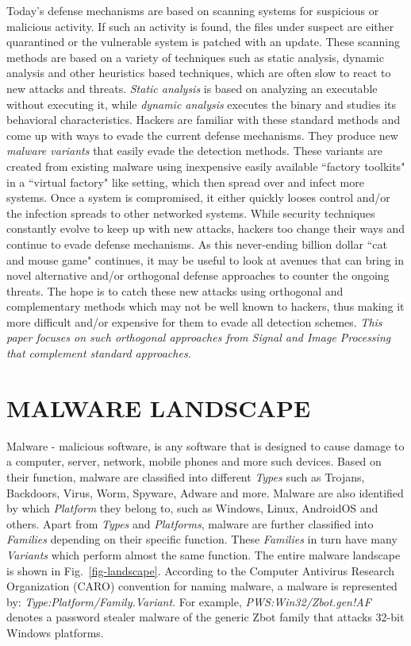 \documentclass[journal]{IEEEtran}
\begin{document}
Today's defense mechanisms are based on scanning systems for suspicious or malicious activity.
If such an activity is found, the files under suspect are either quarantined or the vulnerable system is patched with an update. These scanning methods are based on a variety of techniques such as static analysis, dynamic analysis and other heuristics based techniques, which are often slow to react to new attacks and threats.
\emph{Static analysis} is based on analyzing an executable without executing it, while \emph{dynamic analysis} executes the binary and studies its behavioral characteristics.
Hackers are familiar with these standard methods and come up with ways to evade the current defense mechanisms.
They produce new \emph{malware variants} that easily evade the detection methods.
These variants are created from existing malware using inexpensive easily available ``factory toolkits" in a ``virtual factory" like setting, which then spread over and infect more systems.
Once a system is compromised, it either quickly looses control and/or the infection spreads to other networked systems.  
While security techniques constantly evolve to keep up with new attacks, hackers too change their ways and continue to evade defense mechanisms.
As this never-ending billion dollar ``cat and mouse game" continues, it may be useful to look at avenues that can bring in novel alternative and/or orthogonal defense approaches to counter the ongoing threats.
The hope is to catch these new attacks using orthogonal and complementary methods which may not be well known to hackers, thus making it more difficult and/or expensive for them to evade all detection schemes.
\emph{This paper focuses on such orthogonal approaches from Signal and Image Processing that complement standard approaches.}

\section*{MALWARE LANDSCAPE}


 Malware - malicious software, is any software that is designed to cause damage to a computer, server, network, mobile phones and more such devices.
Based on their function, malware are classified into different \emph{Types} such as Trojans, Backdoors, Virus, Worm, Spyware, Adware and more.
Malware are also identified by which \emph{Platform} they belong to, such as Windows, Linux, AndroidOS and others.
Apart from \emph{Types} and \emph{Platforms}, malware are further classified into \emph{Families} depending on their specific function. 
These \emph{Families} in turn have many \emph{Variants} which perform almost the same function. 
The entire malware landscape is shown in Fig.~\ref{fig-landscape}.
According to the Computer Antivirus Research Organization (CARO) convention for naming malware, a malware is represented by: \emph{Type:Platform/Family.Variant}.
For example, \emph{PWS:Win32/Zbot.gen!AF} denotes a password stealer malware of the generic Zbot family that attacks 32-bit Windows platforms.
\end{document}
